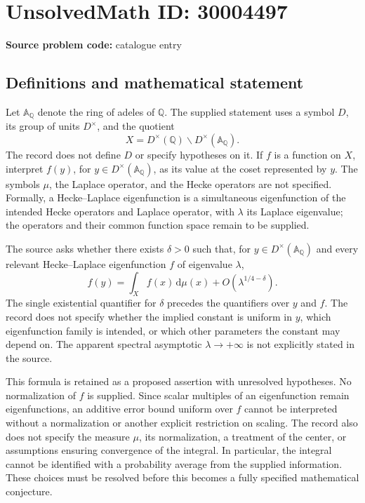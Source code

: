 \documentclass[11pt]{article}
\begin{document}
\section*{UnsolvedMath ID: 30004497}
\textbf{Source problem code:} catalogue entry
\subsection{Definitions and mathematical statement}
Let \(\mathbb A_{\mathbb Q}\) denote the ring of adeles of \(\mathbb Q\). The supplied statement uses a symbol \(D\), its group of units \(D^\times\), and the quotient
\[
X=D^\times(\mathbb Q)\backslash D^\times(\mathbb A_{\mathbb Q}).
\]
The record does not define \(D\) or specify hypotheses on it. If \(f\) is a function on \(X\), interpret \(f(y)\), for \(y\in D^\times(\mathbb A_{\mathbb Q})\), as its value at the coset represented by \(y\). The symbols \(\mu\), the Laplace operator, and the Hecke operators are not specified. Formally, a Hecke--Laplace eigenfunction is a simultaneous eigenfunction of the intended Hecke operators and Laplace operator, with \(\lambda\) its Laplace eigenvalue; the operators and their common function space remain to be supplied.

The source asks whether there exists \(\delta>0\) such that, for \(y\in D^\times(\mathbb A_{\mathbb Q})\) and every relevant Hecke--Laplace eigenfunction \(f\) of eigenvalue \(\lambda\),
\[
f(y)=\int_X f(x)\,\mathrm d\mu(x)
       +O\!\left(\lambda^{1/4-\delta}\right).
\]
The single existential quantifier for \(\delta\) precedes the quantifiers over \(y\) and \(f\). The record does not specify whether the implied constant is uniform in \(y\), which eigenfunction family is intended, or which other parameters the constant may depend on. The apparent spectral asymptotic \(\lambda\to+\infty\) is not explicitly stated in the source.

This formula is retained as a proposed assertion with unresolved hypotheses. No normalization of \(f\) is supplied. Since scalar multiples of an eigenfunction remain eigenfunctions, an additive error bound uniform over \(f\) cannot be interpreted without a normalization or another explicit restriction on scaling. The record also does not specify the measure \(\mu\), its normalization, a treatment of the center, or assumptions ensuring convergence of the integral. In particular, the integral cannot be identified with a probability average from the supplied information. These choices must be resolved before this becomes a fully specified mathematical conjecture.
\end{document}
